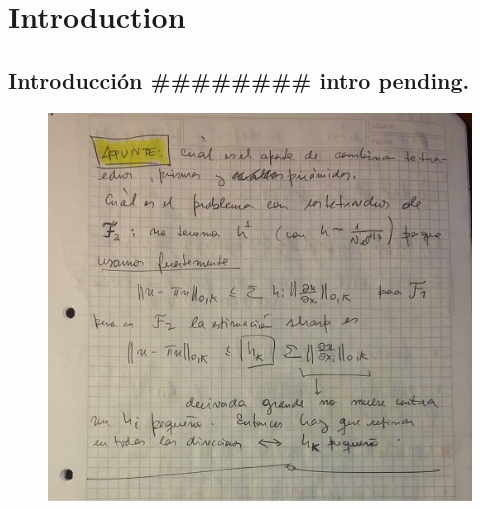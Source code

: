 \chapter{Introduction}
\section{Introducci\'on {\color{Orange}\#\#\#\#\#\#\#\# intro pending.}} %
\begin{figure}
  \centering
  \includegraphics[scale=.28]{./figures/motiv.png}
\end{figure}
